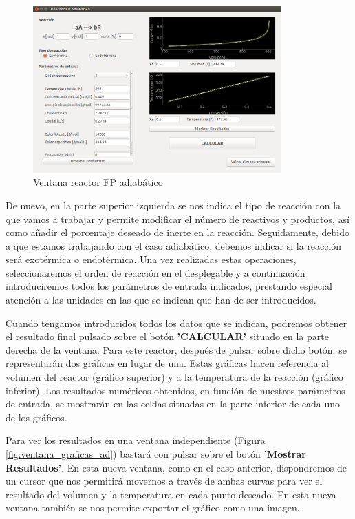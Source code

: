 \begin{figure}[h!]
	\begin{center}
		\includegraphics[width=0.85\textwidth]{./imagenes/reactor_fp/adiabatico1.png}\caption{Ventana reactor FP adiabático}\label{fig:ventana_adiabatico}
	\end{center}
\end{figure}

De nuevo, en la parte superior izquierda se nos indica el tipo de reacción con la que vamos a trabajar y permite modificar el número de reactivos y productos, así como añadir el porcentaje deseado de inerte en la reacción. Seguidamente, debido a que estamos trabajando con el caso adiabático, debemos indicar si la reacción será exotérmica o endotérmica. Una vez realizadas estas operaciones, seleccionaremos el orden de reacción en el desplegable y a continuación introduciremos todos los parámetros de entrada indicados, prestando especial atención a las unidades en las que se indican que han de ser introducidos.

Cuando tengamos introducidos todos los datos que se indican, podremos obtener el resultado final pulsado sobre el botón \textbf{'CALCULAR'} situado en la parte derecha de la ventana. Para este reactor, después de pulsar sobre dicho botón, se representarán dos gráficas en lugar de una. Estas gráficas hacen referencia al volumen del reactor (gráfico superior) y a la temperatura de la reacción (gráfico inferior). Los resultados numéricos obtenidos, en función de nuestros parámetros de entrada, se mostrarán en las celdas situadas en la parte inferior de cada uno de los gráficos.

Para ver los resultados en una ventana independiente (Figura \ref{fig:ventana_graficas_ad}) bastará con pulsar sobre el botón \textbf{'Mostrar Resultados'}. En esta nueva ventana, como en el caso anterior, dispondremos de un cursor que nos permitirá movernos a través de ambas curvas para ver el resultado del volumen y la temperatura en cada punto deseado. En esta nueva ventana también se nos permite exportar el gráfico como una imagen.

